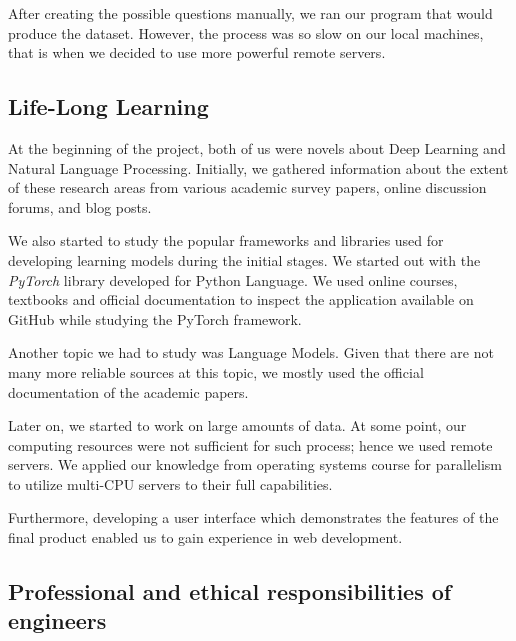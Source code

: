 \documentclass{mefsdp}
\begin{document}
	After creating the possible questions manually, we ran our program that would produce the dataset. However, the process was so slow on our local machines, that is when we decided to use more powerful remote servers. \newline \par
	
	
	
	
	\subsection{Life-Long Learning}
	At the beginning of the project, both of us were novels about Deep Learning and Natural Language Processing. Initially, we gathered information about the extent of these research areas from various academic survey papers, online discussion forums, and blog posts. \newline \par
	
	We also started to study the popular frameworks and libraries used for developing learning models during the initial stages. We started out with the \textit{PyTorch} library developed for Python Language. We used online courses, textbooks and official documentation to inspect the application available on GitHub while studying the PyTorch framework. \newline \par
	
	Another topic we had to study was Language Models. Given that there are not many more reliable sources at this topic, we mostly used the official documentation of the academic papers.\newline \par
	
	Later on, we started to work on large amounts of data. At some point, our computing resources were not sufficient for such process; hence we used remote servers. We applied our knowledge from operating systems course for parallelism to utilize multi-CPU servers to their full capabilities. \newline \par
	
	Furthermore, developing a user interface which demonstrates the features of the final product enabled us to gain experience in web development.  
	
	\subsection{Professional and ethical responsibilities of engineers}
	
\end{document}
